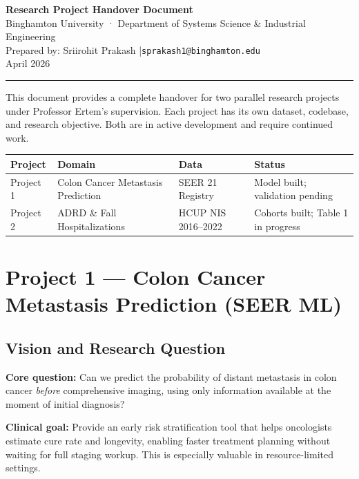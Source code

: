 \documentclass[11pt,letterpaper]{article}
\begin{document}
\begin{center}
{\LARGE\bfseries\color{projblue} Research Project Handover Document}\\[6pt]
{\large Binghamton University · Department of Systems Science \& Industrial Engineering}\\[4pt]
{\normalsize Prepared by: Sriirohit Prakash \quad|\quad \texttt{sprakash1@binghamton.edu}}\\[4pt]
{\normalsize April 2026}\\[10pt]
\rule{\linewidth}{1pt}
\end{center}

\vspace{0.3cm}
\begin{tcolorbox}[colback=projblue!6, colframe=projblue,
  title=\textbf{Overview — Two Active Research Projects}]
This document provides a complete handover for two parallel research projects under
Professor Ertem's supervision. Each project has its own dataset, codebase, and research
objective. Both are in active development and require continued work.

\medskip
\begin{tabular}{llll}
\toprule
\textbf{Project} & \textbf{Domain} & \textbf{Data} & \textbf{Status} \\
\midrule
Project 1 & Colon Cancer Metastasis Prediction & SEER 21 Registry & Model built; validation pending \\
Project 2 & ADRD \& Fall Hospitalizations       & HCUP NIS 2016–2022 & Cohorts built; Table 1 in progress \\
\bottomrule
\end{tabular}
\end{tcolorbox}

\newpage

\section{Project 1 — Colon Cancer Metastasis Prediction (SEER ML)}

\subsection{Vision and Research Question}

\begin{tcolorbox}[colback=lightgray, colframe=projblue!50]
\textbf{Core question:} Can we predict the probability of distant metastasis in colon
cancer \emph{before} comprehensive imaging, using only information available at the
moment of initial diagnosis?

\medskip
\textbf{Clinical goal:} Provide an early risk stratification tool that helps oncologists
estimate cure rate and longevity, enabling faster treatment planning without waiting for
full staging workup. This is especially valuable in resource-limited settings.
\end{tcolorbox}
\end{document}
